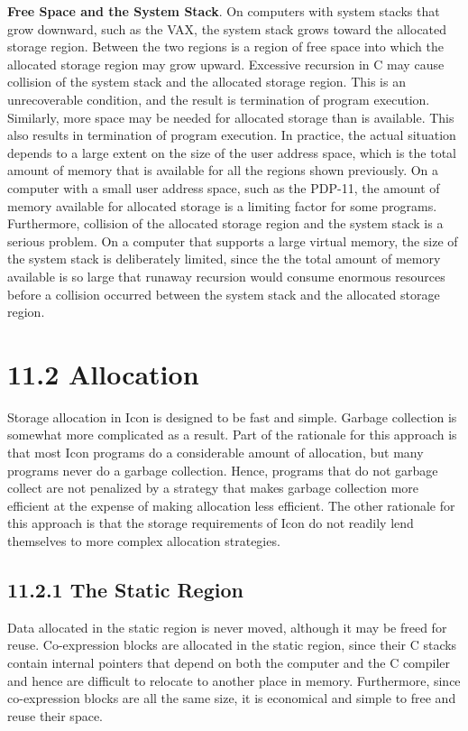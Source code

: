 \textbf{Free Space and the System Stack}. On computers with system
stacks that grow downward, such as the VAX, the system stack grows
toward the allocated storage region. Between the two regions is a
region of free space into which the allocated storage region may grow
upward. Excessive recursion in C may cause collision of the system
stack and the allocated storage region. This is an unrecoverable
condition, and the result is termination of program execution.
Similarly, more space may be needed for allocated storage than is
available. This also results in termination of program execution. In
practice, the actual situation depends to a large extent on the size
of the user address space, which is the total amount of memory that is
available for all the regions shown previously. On a computer with a
small user address space, such as the PDP-11, the amount of memory
available for allocated storage is a limiting factor for some
programs. Furthermore, collision of the allocated storage region and
the system stack is a serious problem. On a computer that supports a
large virtual memory, the size of the system stack is deliberately
limited, since the the total amount of memory available is so large
that runaway recursion would consume enormous resources before a
collision occurred between the system stack and the allocated storage
region.

\section[11.2 Allocation]{11.2 Allocation}

Storage allocation in Icon is designed to be fast and simple. Garbage
collection is somewhat more complicated as a result. Part of the
rationale for this approach is that most Icon programs do a
considerable amount of allocation, but many programs never do a
garbage collection. Hence, programs that do not garbage collect are
not penalized by a strategy that makes garbage collection more
efficient at the expense of making allocation less efficient. The
other rationale for this approach is that the storage requirements of
Icon do not readily lend themselves to more complex allocation
strategies.

\subsection[11.2.1 The Static Region]{11.2.1 The Static Region}

Data allocated in the static region is never moved, although it may be
freed for reuse. Co-expression blocks are allocated in the static
region, since their C stacks contain internal pointers that depend on
both the computer and the C compiler and hence are difficult to
relocate to another place in memory. Furthermore, since co-expression
blocks are all the same size, it is economical and simple to free and
reuse their space.

